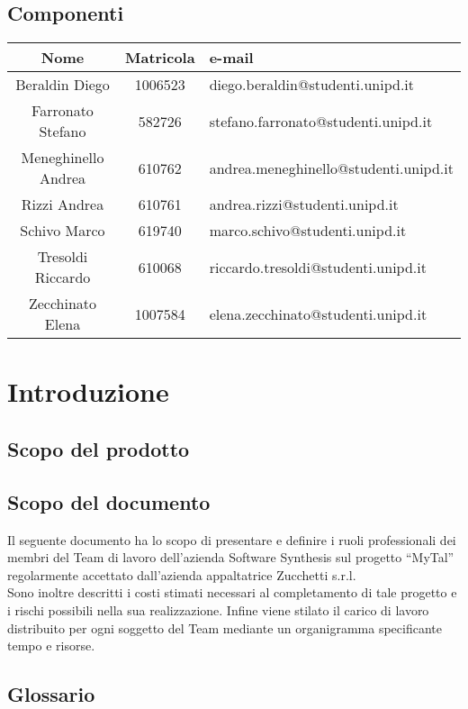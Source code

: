 \subsection{Componenti}
\begin{center}
\begin{tabularx}{0.9\textwidth}{c|c|l}
{\bf Nome}&{\bf Matricola}&{\bf e-mail}\\ 
\hline
Beraldin Diego & 1006523&diego.beraldin@studenti.unipd.it\\
Farronato Stefano & 582726&stefano.farronato@studenti.unipd.it\\
Meneghinello Andrea & 610762&andrea.meneghinello@studenti.unipd.it\\
Rizzi Andrea & 610761&andrea.rizzi@studenti.unipd.it\\
Schivo Marco & 619740&marco.schivo@studenti.unipd.it\\
Tresoldi Riccardo & 610068&riccardo.tresoldi@studenti.unipd.it\\
Zecchinato Elena & 1007584&elena.zecchinato@studenti.unipd.it\\
\end{tabularx}
\end{center}

\clearpage
\section{Introduzione}
\subsection{Scopo del prodotto}
\purpose

\subsection{Scopo del documento}
Il seguente documento ha lo scopo di presentare e definire i ruoli professionali dei membri del Team di lavoro dell'azienda Software Synthesis sul progetto ``MyTal'' regolarmente accettato dall'azienda appaltatrice Zucchetti s.r.l.\\
Sono inoltre descritti i costi stimati necessari al completamento di tale progetto e i rischi possibili nella sua realizzazione. Infine viene stilato il carico di lavoro distribuito per ogni soggetto del Team mediante un organigramma specificante tempo e risorse.
\subsection{Glossario}
\glossaryIntro
